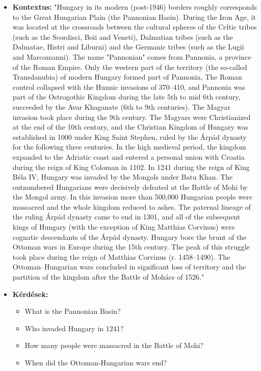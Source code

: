 \begin{itemize}
\item \textbf{Kontextus:} "Hungary in its modern (post-1946) borders roughly corresponds to the Great Hungarian Plain (the Pannonian Basin). During the Iron Age, it was located at the crossroads between the cultural spheres of the Celtic tribes (such as the Scordisci, Boii and Veneti), Dalmatian tribes (such as the Dalmatae, Histri and Liburni) and the Germanic tribes (such as the Lugii and Marcomanni). The name "Pannonian" comes from Pannonia, a province of the Roman Empire. Only the western part of the territory (the so-called Transdanubia) of modern Hungary formed part of Pannonia. The Roman control collapsed with the Hunnic invasions of 370–410, and Pannonia was part of the Ostrogothic Kingdom during the late 5th to mid 6th century, succeeded by the Avar Khaganate (6th to 9th centuries). The Magyar invasion took place during the 9th century. The Magyars were Christianized at the end of the 10th century, and the Christian Kingdom of Hungary was established in 1000 under King Saint Stephen, ruled by the Árpád dynasty for the following three centuries. In the high medieval period, the kingdom expanded to the Adriatic coast and entered a personal union with Croatia during the reign of King Coloman in 1102. In 1241 during the reign of King Béla IV, Hungary was invaded by the Mongols under Batu Khan. The outnumbered Hungarians were decisively defeated at the Battle of Mohi by the Mongol army. In this invasion more than 500,000 Hungarian people were massacred and the whole kingdom reduced to ashes. The paternal lineage of the ruling Árpád dynasty came to end in 1301, and all of the subsequent kings of Hungary (with the exception of King Matthias Corvinus) were cognatic descendants of the Árpád dynasty. Hungary bore the brunt of the Ottoman wars in Europe during the 15th century. The peak of this struggle took place during the reign of Matthias Corvinus (r. 1458–1490). The Ottoman–Hungarian wars concluded in significant loss of territory and the partition of the kingdom after the Battle of Mohács of 1526."
\item \textbf{Kérdések:} 
	\begin{itemize}
		\item What is the Pannonian Basin?
		\item Who invaded Hungary in 1241?
		\item How many people were massacred in the Battle of Mohi?
		\item When did the Ottoman-Hungarian wars end?
	\end{itemize}

\end{itemize}
